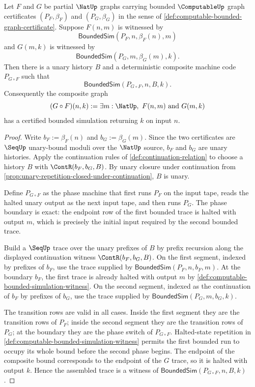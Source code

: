 \begin{theorem}
\label{thm:computable-composition-bounded-simulation}
Let $F$ and $G$ be partial $\NatUp$ graphs carrying bounded $\ComputableUp$ graph certificates $(P_F,\beta_F)$ and $(P_G,\beta_G)$ in the sense of \autoref{def:computable-bounded-graph-certificate}. Suppose $F(n,m)$ is witnessed by
$$
  \mathsf{BoundedSim}(P_F,n,\beta_F(n),m)
$$
and $G(m,k)$ is witnessed by
$$
  \mathsf{BoundedSim}(P_G,m,\beta_G(m),k).
$$
Then there is a unary history $B$ and a deterministic composite machine code $P_{G\circ F}$ such that
$$
  \mathsf{BoundedSim}(P_{G\circ F},n,B,k).
$$
Consequently the composite graph
$$
  (G\circ F)(n,k) := \exists m:\NatUp,\ F(n,m)\ \text{and}\ G(m,k)
$$
has a certified bounded simulation returning $k$ on input $n$.
\end{theorem}
\begin{proof}
Write $b_F:=\beta_F(n)$ and $b_G:=\beta_G(m)$. Since the two certificates are $\SeqUp$ unary-bound moduli over the $\NatUp$ source, $b_F$ and $b_G$ are unary histories. Apply the continuation rules of \autoref{def:continuation-relation} to choose a history $B$ with $\ContR(b_F,b_G,B)$. By unary closure under continuation from \autoref{prop:unary-repetition-closed-under-continuation}, $B$ is unary.

Define $P_{G\circ F}$ as the phase machine that first runs $P_F$ on the input tape, reads the halted unary output as the next input tape, and then runs $P_G$. The phase boundary is exact: the endpoint row of the first bounded trace is halted with output $m$, which is precisely the initial input required by the second bounded trace.

Build a $\SeqUp$ trace over the unary prefixes of $B$ by prefix recursion along the displayed continuation witness $\ContR(b_F,b_G,B)$. On the first segment, indexed by prefixes of $b_F$, use the trace supplied by $\mathsf{BoundedSim}(P_F,n,b_F,m)$. At the boundary $b_F$, the first trace is already halted with output $m$ by \autoref{def:computable-bounded-simulation-witness}. On the second segment, indexed as the continuation of $b_F$ by prefixes of $b_G$, use the trace supplied by $\mathsf{BoundedSim}(P_G,m,b_G,k)$.

The transition rows are valid in all cases. Inside the first segment they are the transition rows of $P_F$; inside the second segment they are the transition rows of $P_G$; at the boundary they are the phase switch of $P_{G\circ F}$. Halted-state repetition in \autoref{def:computable-bounded-simulation-witness} permits the first bounded run to occupy its whole bound before the second phase begins. The endpoint of the composite bound corresponds to the endpoint of the $G$ trace, so it is halted with output $k$. Hence the assembled trace is a witness of $\mathsf{BoundedSim}(P_{G\circ F},n,B,k)$.
\end{proof}

